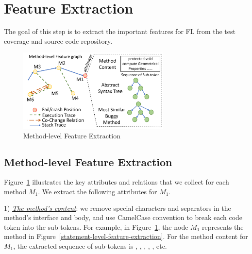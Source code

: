 \section{Feature Extraction}
\label{feature-extract:sec}


The goal of this step is to extract the important features for FL from
the test coverage and source code repository.


\begin{figure}[t]
	\centering
	\includegraphics[width=3in]{graphs/step-1-method.png}
	\caption{Method-level Feature Extraction}
	\label{method-level-feature-extraction}
\end{figure}

\subsection{Method-level Feature Extraction}

Figure~\ref{method-level-feature-extraction} illustrates the key
attributes and relations that we collect for each method $M_1$. We
extract the following \underline{attributes} for
$M_1$.

1) {\em \underline{The method's content}}: we remove special
characters and separators in the method's interface and body, and use
CamelCase convention to break each code token into the sub-tokens. For
example, in Figure~\ref{method-level-feature-extraction}, the node
$M_1$ represents the method  in
Figure~\ref{statement-level-feature-extraction}. For the method
content for $M_1$, the extracted sequence of sub-tokens is
, , , ,
, etc.


